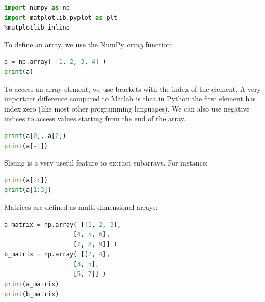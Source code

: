 \documentclass[a4paper , 12pt]{book}
\begin{document}
\begin{center}
\begin{lstlisting}[language=Python, frame=single]
import numpy as np
import matplotlib.pyplot as plt
%matplotlib inline
\end{lstlisting}
\end{center}

To define an array, we use the NumPy \textit{array} function:

\begin{center}
\begin{lstlisting}[language=Python, frame=single]
a = np.array( [1, 2, 3, 4] )
print(a)
\end{lstlisting}
\end{center}

To access an array element, we use brackets with the index of the element. A very important difference compared to Matlab is that in Python the first element has index zero (like most other programming languages). We can also use negative indices to access values starting from the end of the array.

\begin{center}
\begin{lstlisting}[language=Python, frame=single]
print(a[0], a[2])
print(a[-1])
\end{lstlisting}
\end{center}

Slicing is a very useful feature to extract subarrays. For instance:

\begin{center}
\begin{lstlisting}[language=Python, frame=single]
print(a[2:])
print(a[1:3])
\end{lstlisting}
\end{center}

Matrices are defined as multi-dimensional arrays:

\begin{center}
\begin{lstlisting}[language=Python, frame=single]
a_matrix = np.array( [[1, 2, 3], 
                   [4, 5, 6], 
                   [7, 8, 9]] )
b_matrix = np.array( [[2, 4],
                   [3, 5],
                   [5, 7]] )
print(a_matrix)
print(b_matrix)
\end{lstlisting}
\end{center}
\end{document}
